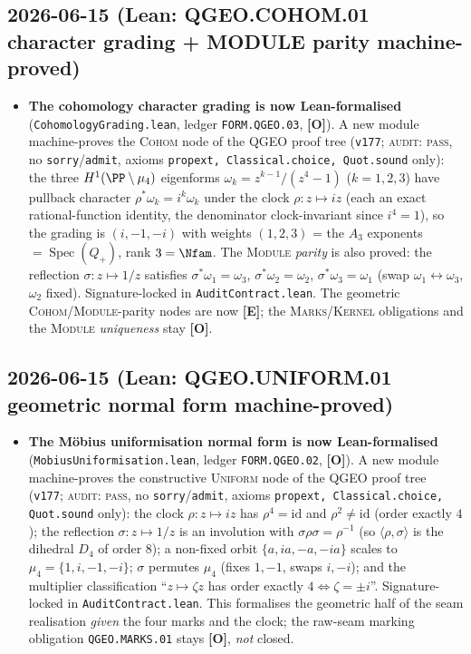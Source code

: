 \documentclass[11pt]{article}
\providecommand{\mE}{\textbf{[E]}}\providecommand{\mC}{\textbf{[C]}}
\providecommand{\mO}{\textbf{[O]}}\providecommand{\mX}{\textbf{[X]}}
\begin{document}
\subsection*{2026-06-15 (Lean: QGEO.COHOM.01 character grading + MODULE parity machine-proved)}
\begin{itemize}
\item \textbf{The cohomology character grading is now Lean-formalised}
  (\texttt{CohomologyGrading.lean}, ledger \texttt{FORM.QGEO.03}, \mO). A new module machine-proves the
  \textsc{Cohom} node of the QGEO proof tree (\texttt{v177}; \textsc{audit: pass}, no
  \texttt{sorry}/\texttt{admit}, axioms \texttt{propext, Classical.choice, Quot.sound} only): the three
  $H^1(\PP\setminus\mu_4)$ eigenforms $\omega_k=z^{k-1}/(z^4-1)$ ($k{=}1,2,3$) have pullback character
  $\rho^*\omega_k=i^k\omega_k$ under the clock $\rho:z\mapsto iz$ (each an exact rational-function identity,
  the denominator clock-invariant since $i^4{=}1$), so the grading is $(i,-1,-i)$ with weights $(1,2,3)$ =
  the $A_3$ exponents $=\operatorname{Spec}(Q_+)$, rank $3=\Nfam$. The \textsc{Module} \emph{parity} is also
  proved: the reflection $\sigma:z\mapsto1/z$ satisfies $\sigma^*\omega_1=\omega_3$,
  $\sigma^*\omega_2=\omega_2$, $\sigma^*\omega_3=\omega_1$ (swap $\omega_1\!\leftrightarrow\!\omega_3$,
  $\omega_2$ fixed). Signature-locked in \texttt{AuditContract.lean}. The geometric \textsc{Cohom}/\textsc{Module}-parity
  nodes are now \mE; the \textsc{Marks}/\textsc{Kernel} obligations and the \textsc{Module} \emph{uniqueness}
  stay \mO.
\end{itemize}

\subsection*{2026-06-15 (Lean: QGEO.UNIFORM.01 geometric normal form machine-proved)}
\begin{itemize}
\item \textbf{The M\"obius uniformisation normal form is now Lean-formalised}
  (\texttt{Mobius\allowbreak Uniformisation.lean}, ledger \texttt{FORM.QGEO.02}, \mO). A new module machine-proves the
  constructive \textsc{Uniform} node of the QGEO proof tree (\texttt{v177}; \textsc{audit: pass}, no
  \texttt{sorry}/\texttt{admit}, axioms \texttt{propext, Classical.choice, Quot.sound} only): the clock
  $\rho:z\mapsto iz$ has $\rho^4{=}\mathrm{id}$ and $\rho^2{\neq}\mathrm{id}$ (order exactly $4$); the
  reflection $\sigma:z\mapsto1/z$ is an involution with $\sigma\rho\sigma=\rho^{-1}$ (so $\langle\rho,\sigma
  \rangle$ is the dihedral $D_4$ of order $8$); a non-fixed orbit $\{a,ia,-a,-ia\}$ scales to
  $\mu_4=\{1,i,-1,-i\}$; $\sigma$ permutes $\mu_4$ (fixes $1,-1$, swaps $i,-i$); and the multiplier
  classification ``$z\mapsto\zeta z$ has order exactly $4\Leftrightarrow\zeta=\pm i$''. Signature-locked in
  \texttt{AuditContract.lean}. This formalises the geometric half of the seam realisation \emph{given} the
  four marks and the clock; the raw-seam marking obligation \texttt{QGEO.MARKS.01} stays \mO, \emph{not}
  closed.
\end{itemize}
\end{document}
